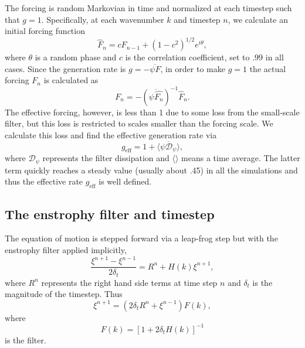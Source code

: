 \documentclass{jfm}
\newcommand{\ca}  [1]{\mathcal{#1}}
\begin{document}
The forcing is random Markovian in time and normalized at each
timestep such that $g=1$.  Specifically, at each wavenumber $k$ and
timestep $n$, we calculate an initial forcing function
\begin{equation}
\hat{F}_n = cF_{n-1} + (1-c^2)^{1/2}e^{i\theta},
\label{rmf:eq}
\end{equation}
where $\theta$ is a random phase and $c$ is the correlation
coefficient, set to $.99$ in all cases.  Since the generation rate is
$g = -\overline{\psi F}$, in order to make $g=1$ the actual forcing
$F_n$ is calculated as
\begin{equation}
F_n = -\left(\overline{\psi \hat{F_n}}\right)^{-1} \hat{F}_n.
\label{rmf2:eq}
\end{equation}
The effective forcing, however, is less than 1 due to some loss from
the small-scale filter, but this loss is restricted to scales smaller
than the forcing scale.  We calculate this loss and find the effective
generation rate via
\begin{equation}
g_{\mathrm{eff}} = 1 + \langle\overline{\psi \ca{D}_{\psi}}\rangle,
\label{geff:eq}
\end{equation}
where $\ca{D}_{\psi}$ represents the filter dissipation and
$\langle\rangle$ means a time average.  The latter term quickly
reaches a steady value (usually about .45) in all the simulations and
thus the effective rate $g_{\mathrm{eff}}$ is well defined.

\subsection*{The enstrophy filter and timestep}

The equation of motion is stepped forward via a leap-frog step but
with the enstrophy filter applied implicitly,
\begin{equation}
\frac{\xi^{n+1}-\xi^{n-1}}{2\delta_t} = R^n + H(k)\xi^{n+1},
\end{equation}
where $R^n$ represents the right hand side terms at time step $n$ and
$\delta_t$ is the magnitude of the timestep.  Thus
\begin{equation}
\xi^{n+1} =  (2\delta_t R^n + \xi^{n-1})F(k),
\end{equation}
where
\begin{equation}
F(k) = [1 + 2\delta_tH(k)]^{-1}
\end{equation}
is the filter.
\end{document}
